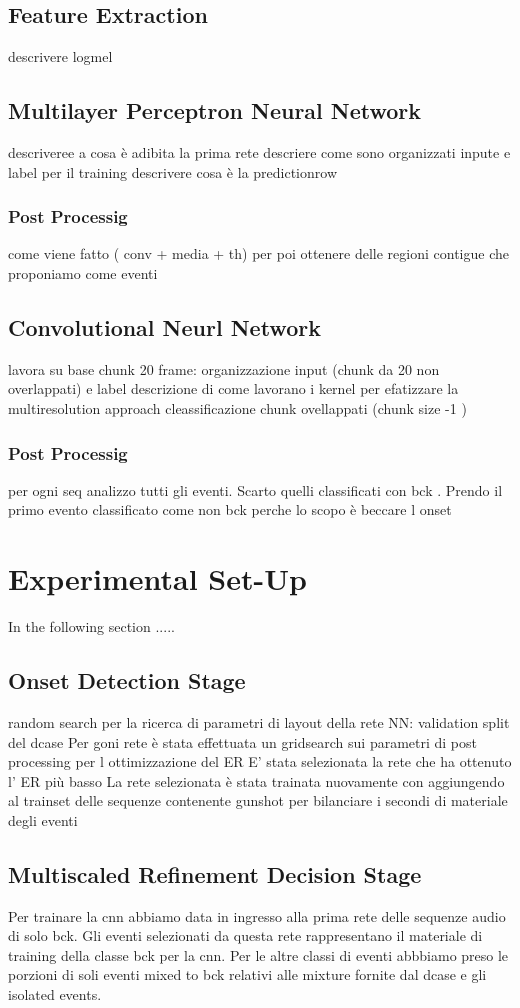 \documentclass{article}
\begin{document}
\begin{sloppy}
\subsection{Feature Extraction}
descrivere logmel
\subsection{Multilayer Perceptron Neural Network}
descriveree a cosa è adibita la prima rete
descriere come sono organizzati inpute e label per il training
descrivere cosa è la predictionrow
\subsubsection{Post Processig }
come viene fatto ( conv + media + th) 
per poi ottenere delle regioni contigue che proponiamo come eventi
\subsection{Convolutional Neurl Network}
lavora su base chunk 20 frame: organizzazione input (chunk da 20 non overlappati) e label 
descrizione di come lavorano i kernel per efatizzare la multiresolution approach
cleassificazione chunk ovellappati (chunk size -1 )
\subsubsection{Post Processig }
per ogni seq analizzo tutti gli eventi. Scarto quelli classificati con bck . Prendo il primo evento classificato come non bck perche lo scopo è beccare l onset

\section{Experimental Set-Up}
\label{sec:pagestyle}
In the following section .....
\subsection{Onset Detection Stage}
random search per la ricerca di parametri di layout della rete NN: validation split del dcase 
Per goni rete è stata effettuata un gridsearch sui parametri di post processing per l ottimizzazione del ER
E' stata selezionata la rete che ha ottenuto l' ER più basso
La rete selezionata è stata trainata nuovamente con aggiungendo al trainset delle sequenze  contenente gunshot per bilanciare i secondi di materiale degli eventi

\subsection{Multiscaled Refinement Decision Stage}
Per trainare la cnn abbiamo data in ingresso alla prima rete delle sequenze audio di solo bck. Gli eventi selezionati da questa rete rappresentano il materiale di training
della classe bck per la cnn. Per le altre classi di eventi abbbiamo preso le porzioni di soli eventi mixed to bck relativi alle mixture fornite dal dcase e gli isolated events.


\end{sloppy}
\end{document}
